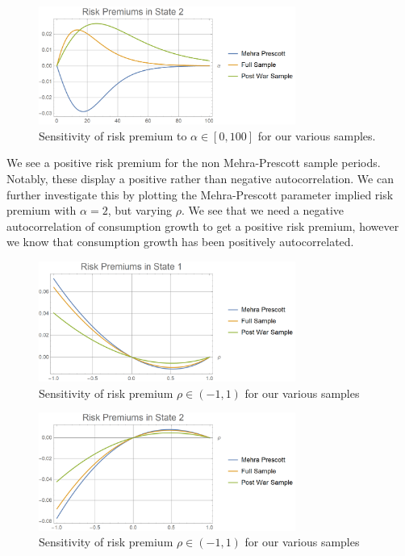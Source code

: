 \documentclass[french]{article}
\begin{document}
\begin{enumerate}[I.]
 \begin{figure}[!htb]
	\centering
	\includegraphics[width=0.75\textwidth]{risk_premium_alpha_2.png}
	\caption{Sensitivity of risk premium to $\alpha\in\left[0, 100\right]$ for our various samples.}
	\label{fig:risk_premium_alpha_2}
\end{figure}
We see a positive risk premium for the non Mehra-Prescott sample periods. Notably, these display a positive rather than negative autocorrelation. We can further investigate this by plotting the Mehra-Prescott parameter implied risk premium with $\alpha = 2$, but varying $\rho$. We see that we need a negative autocorrelation of consumption growth to get a positive risk premium, however we know that consumption growth has been positively autocorrelated. 
  \begin{figure}[!htb]
 	\centering
 	\includegraphics[width=0.75\textwidth]{risk_premium_rho.png}
 	\caption{Sensitivity of risk premium $\rho\in(-1, 1)$ for our various samples}
 	\label{fig:risk_premium_rho}
 \end{figure}
\end{enumerate}
  \begin{figure}[!htb]
	\centering
	\includegraphics[width=0.75\textwidth]{risk_premium_rho_2.png}
	\caption{Sensitivity of risk premium $\rho\in(-1, 1)$ for our various samples}
	\label{fig:risk_premium_rho_2}
\end{figure}
\end{document}
